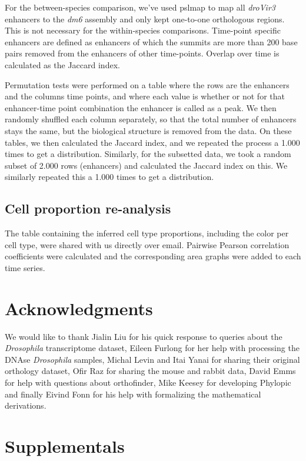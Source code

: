 For the between-species comparison, we've used pslmap to map all \textit{droVir3} enhancers to the \textit{dm6} assembly and only kept one-to-one orthologous regions.  This is not necessary for the within-species comparisons. Time-point specific enhancers are defined as enhancers of which the summits are more than 200 base pairs removed from the enhancers of other time-points. Overlap over time is calculated as the Jaccard index.

Permutation tests were performed on a table where the rows are the enhancers and the columns time points, and where each value is whether or not for that enhancer-time point combination the enhancer is called as a peak. We then randomly shuffled each column separately, so that the total number of enhancers stays the same, but the biological structure is removed from the data. On these tables, we then calculated the Jaccard index, and we repeated the process a 1.000 times to get a distribution. Similarly, for the subsetted data, we took a random subset of 2.000 rows (enhancers) and calculated the Jaccard index on this. We similarly repeated this a 1.000 times to get a distribution.

\subsection{Cell proportion re-analysis}

The table containing the inferred cell type proportions, including the color per cell type, were shared with us directly over email. Pairwise Pearson correlation coefficients were calculated and the corresponding area graphs were added to each time series.

\section{Acknowledgments}

We would like to thank Jialin Liu for his quick response to queries about the \textit{Drosophila} transcriptome dataset, Eileen Furlong for her help with processing the DNAse \textit{Drosophila} samples, Michal Levin and Itai Yanai for sharing their original orthology dataset, Ofir Raz for sharing the mouse and rabbit data, David Emms for help with questions about orthofinder, Mike Keesey for developing Phylopic and finally Eivind Fonn for his help with formalizing the mathematical derivations.

\section{Supplementals}

